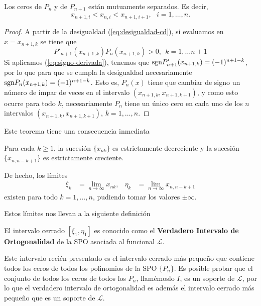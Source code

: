 \begin{teorema}
    Los ceros de $P_n$ y de $P_{n+1}$ están mutuamente separados. Es decir,
    $$
    x_{n+1,i} < x_{n,i} < x_{n+1,i+1}, \ \ \ i=1,\dots, n.
    $$
\end{teorema}
\begin{proof}
    A partir de la desigualdad (\ref{eq:desigualdad-cd}), si evaluamos en $x=x_{n+1,k}$ se tiene que
    $$
    P'_{n+1}(x_{n+1,k})P_n(x_{n+1,k})>0, \ \ k=1,\dots n+1
    $$
    Si aplicamos (\ref{eq:signo-derivada}), tenemos que $\mathrm{sgn}  P'_{n+1}(x_{n+1,k}) = (-1)^{n+1-k}$, por lo que para que se cumpla la desigualdad necesariamente $\mathrm{sgn} P_n(x_{n+1,k}) = (-1)^{n+1-k}$.
    Esto es, $P_n(x)$ tiene que cambiar de signo un número de impar de veces en el intervalo $(x_{n+1,k},x_{n+1,k+1})$, y como esto ocurre para todo $k$, necesariamente $P_n$ tiene un único cero en cada uno de los $n$ intervalos $(x_{n+1,k},x_{n+1,k+1})$, $k=1,\dots, n$.
\end{proof}

Este teorema tiene una consecuencia inmediata

\begin{corolario}
    \label{cor:sucesiones-ceros}
    Para cada $k\geq 1$, la sucesión $\{x_{nk}\}$ es estrictamente decreciente y la sucesión $\{x_{n,n-k+1}\}$ es estrictamente creciente. 

    De hecho, los límites
    \begin{align*}
        \xi_k &= \lim_{n\rightarrow\infty} x_{nk}, &  \eta_k &= \lim_{n\rightarrow\infty} x_{n,n-k+1}
    \end{align*}
    existen para todo $k=1,\dots,n$, pudiendo tomar los valores $\pm \infty$.
\end{corolario}

Estos límites nos llevan a la siguiente definición

\begin{definicion}
    El intervalo cerrado $[\xi_1,\eta_1]$ es conocido como el \textbf{Verdadero Intervalo de Ortogonalidad} de la SPO asociada al funcional $\mathcal{L}$.
\end{definicion}

Este intervalo recién presentado es el intervalo cerrado más pequeño que contiene todos los ceros de todos los polinomios de la SPO $\{P_n\}$. Es posible probar que el conjunto de todos los ceros de todos los $P_n$, llamémoslo $I$, es un soporte de $\mathcal{L}$, por lo que el verdadero intervalo de ortogonalidad es además el intervalo cerrado más pequeño que es un soporte de $\mathcal{L}$.

